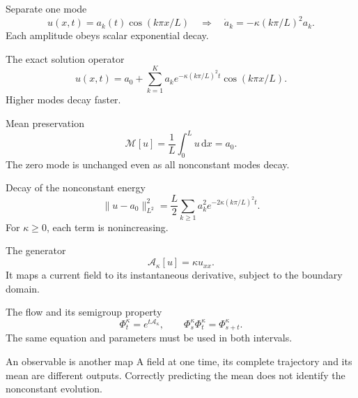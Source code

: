 \documentclass[aspectratio=169,11pt]{beamer}
\newcommand{\notestarget}{notes.pdf}\newcommand{\noteslabel}{Notes}
\begin{document}
\renewcommand{\notestarget}{notes.pdf\#note-the-neumann-heat-solution-by-cosine-expansion}
\begin{frame}[t,fragile,label=slide-separate-one-mode]{Separate one mode}
\[u(x,t)=a_k(t)\cos(k\pi x/L)\quad\Longrightarrow\quad\dot a_k=-\kappa(k\pi/L)^2a_k.\]\pause{} Each amplitude obeys scalar exponential decay.
\end{frame}
\renewcommand{\notestarget}{notes.pdf\#note-the-neumann-heat-solution-by-cosine-expansion}
\begin{frame}[t,fragile,label=slide-the-exact-solution-operator]{The exact solution operator}
\[u(x,t)=a_0+\sum_{k=1}^K a_k e^{-\kappa(k\pi/L)^2t}\cos(k\pi x/L).\]\pause{} Higher modes decay faster.
\end{frame}
\renewcommand{\notestarget}{notes.pdf\#note-the-neumann-heat-solution-by-cosine-expansion}
\begin{frame}[t,fragile,label=slide-mean-preservation]{Mean preservation}
\[\mathcal M[u]=\frac1L\int_0^L u\,\mathrm dx=a_0.\]\pause{} The zero mode is unchanged even as all nonconstant modes decay.
\end{frame}
\renewcommand{\notestarget}{notes.pdf\#note-the-neumann-heat-solution-by-cosine-expansion}
\begin{frame}[t,fragile,label=slide-decay-of-the-nonconstant-energy]{Decay of the nonconstant energy}
\[\|u-a_0\|_{L^2}^2=\frac L2\sum_{k\ge1}a_k^2e^{-2\kappa(k\pi/L)^2t}.\]\pause{} For $\kappa\ge0$, each term is nonincreasing.
\end{frame}
\renewcommand{\notestarget}{notes.pdf\#note-generator-flow-and-observation-maps}
\begin{frame}[t,fragile,label=slide-the-generator]{The generator}
\[\mathcal A_\kappa[u]=\kappa u_{xx}.\]\pause{} It maps a current field to its instantaneous derivative, subject to the boundary domain.
\end{frame}
\renewcommand{\notestarget}{notes.pdf\#note-generator-flow-and-observation-maps}
\begin{frame}[t,fragile,label=slide-the-flow-and-its-semigroup-property]{The flow and its semigroup property}
\[\Phi_t^\kappa=e^{t\mathcal A_\kappa},\qquad\Phi_s^\kappa\Phi_t^\kappa=\Phi_{s+t}^\kappa.\]\pause{} The same equation and parameters must be used in both intervals.
\end{frame}
\renewcommand{\notestarget}{notes.pdf\#note-generator-flow-and-observation-maps}
\begin{frame}[t,fragile,label=slide-an-observable-is-another-map]{An observable is another map}
A field at one time, its complete trajectory and its mean are different outputs.\pause{} Correctly predicting the mean does not identify the nonconstant evolution.
\end{frame}
\end{document}
